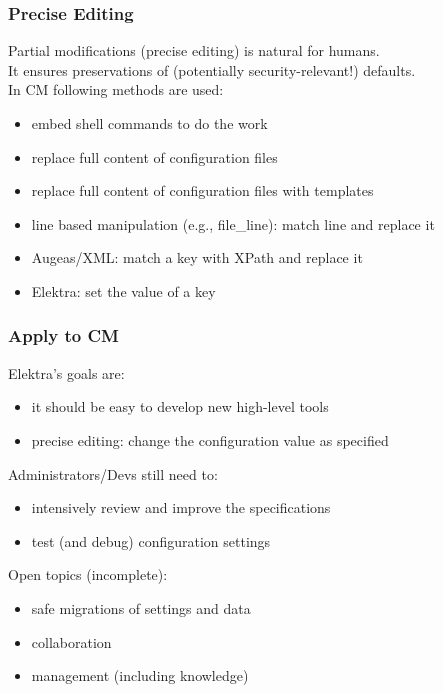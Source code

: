 \begin{frame}
	\frametitle{Precise Editing}

	Partial modifications (precise editing) is natural for humans. \\
	It ensures preservations of (potentially security-relevant!) defaults. \\
	In CM following methods are used:

	\begin{itemize}[<+-| alert@+>] %
	\item embed shell commands to do the work
	\item replace full content of configuration files
	\item replace full content of configuration files with templates
	\item line based manipulation (e.g., file\_line): match line and replace it
	\item Augeas/XML: match a key with XPath and replace it
	\item Elektra: set the value of a key
	\end{itemize}
\end{frame}

\begin{frame}
	\frametitle{Apply to CM}

	Elektra's goals are:

	\begin{itemize}[<+-| alert@+>]
	\item it should be easy to develop new high-level tools
	\item precise editing: change the configuration value as specified
	\end{itemize}

	\pause[\thebeamerpauses]  %

	Administrators/Devs still need to:

	\begin{itemize}[<+-| alert@+>]
	\item intensively review and improve the specifications
	\item test (and debug) configuration settings
	\end{itemize}

	\pause[\thebeamerpauses]  %

	Open topics (incomplete):

	\begin{itemize}[<+-| alert@+>]
	\item safe migrations of settings and data
	\item collaboration
	\item management (including knowledge)
	\end{itemize}
\end{frame}

